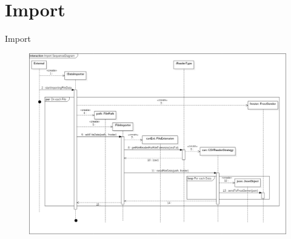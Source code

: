 \section{Import}
Import
\begin{figure}[!hbp]
	\centering
	\includegraphics[width=\linewidth]{images/import/ImportSequenceDiagram.png}
\end{figure}
\newpage

